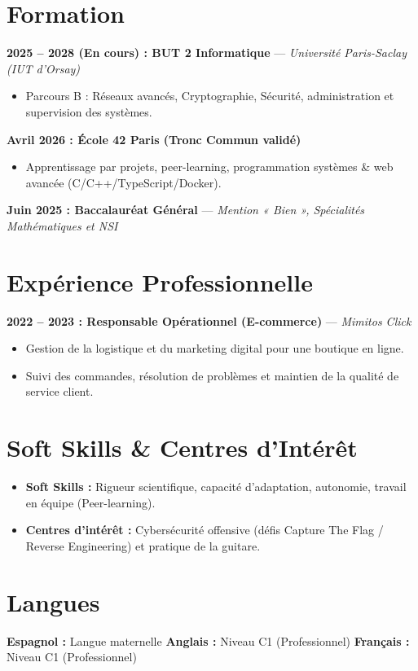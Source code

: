 \documentclass[10pt,a4paper]{article}
\begin{document}
\section*{Formation}
{\small
\textbf{2025 -- 2028 (En cours) : BUT 2 Informatique} --- \textit{Université Paris-Saclay (IUT d'Orsay)}
\begin{itemize}
  \item Parcours B : Réseaux avancés, Cryptographie, Sécurité, administration et supervision des systèmes.
\end{itemize}
\textbf{Avril 2026 : École 42 Paris (Tronc Commun validé)}
\begin{itemize}
  \item Apprentissage par projets, peer-learning, programmation systèmes \& web avancée (C/C++/TypeScript/Docker).
\end{itemize}
\textbf{Juin 2025 : Baccalauréat Général} --- \textit{Mention « Bien », Spécialités Mathématiques et NSI}
}

\section*{Expérience Professionnelle}
{\small
\textbf{2022 -- 2023 : Responsable Opérationnel (E-commerce)} --- \textit{Mimitos Click}
\begin{itemize}
  \item Gestion de la logistique et du marketing digital pour une boutique en ligne.
  \item Suivi des commandes, résolution de problèmes et maintien de la qualité de service client.
\end{itemize}
}

\section*{Soft Skills \& Centres d'Intérêt}
{\small
\begin{itemize}
  \item \textbf{Soft Skills :} Rigueur scientifique, capacité d'adaptation, autonomie, travail en équipe (Peer-learning).
  \item \textbf{Centres d'intérêt :} Cybersécurité offensive (défis Capture The Flag / Reverse Engineering) et pratique de la guitare.
\end{itemize}
}

\section*{Langues}
{\small
\textbf{Espagnol :} Langue maternelle \quad \textperiodcentered{} \quad \textbf{Anglais :} Niveau C1 (Professionnel) \quad \textperiodcentered{} \quad \textbf{Français :} Niveau C1 (Professionnel)
}
\end{document}
